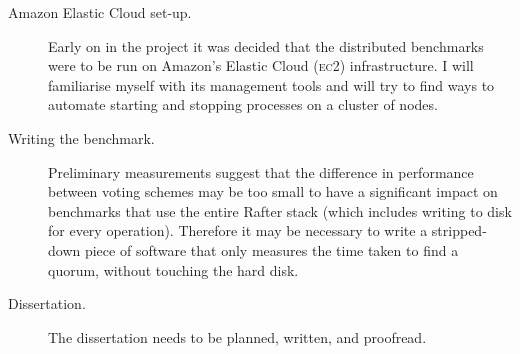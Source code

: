 \documentclass[11pt]{scrartcl}
\begin{document}
\begin{description}
    \item[Amazon Elastic Cloud set-up.] Early on in the project it was decided that the distributed benchmarks were to be run on Amazon's Elastic Cloud (\textsc{ec2}) infrastructure. I will familiarise myself with its management tools and will try to find ways to automate starting and stopping processes on a cluster of nodes.
    \item[Writing the benchmark.] Preliminary measurements suggest that the difference in performance between voting schemes may be too small to have a significant impact on benchmarks that use the entire Rafter stack (which includes writing to disk for every operation). Therefore it may be necessary to write a stripped-down piece of software that only measures the time taken to find a quorum, without touching the hard disk.
    \item[Dissertation.] The dissertation needs to be planned, written, and proofread.
\end{description}



\end{document}
